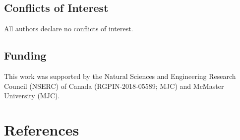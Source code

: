 \documentclass[
  man, donotrepeattitle,floatsintext]{apa7}
\begin{document}
\hypertarget{conflicts-of-interest}{%
\subsection{Conflicts of Interest}\label{conflicts-of-interest}}

\noindent All authors declare no conflicts of interest.

\hypertarget{funding}{%
\subsection{Funding}\label{funding}}

\noindent This work was supported by the Natural Sciences and Engineering Research Council (NSERC) of Canada (RGPIN-2018-05589; MJC) and McMaster University (MJC).

\vspace{3em}

\hypertarget{references}{%
\section{References}\label{references}}

\vspace{2ex}
\end{document}
